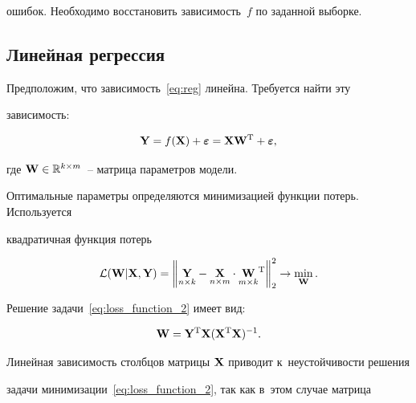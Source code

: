 ошибок. Необходимо восстановить зависимость~$f$ по заданной выборке.



\subsection{Линейная регрессия}



Предположим, что зависимость~\eqref{eq:reg} линейна. Требуется найти эту 

зависимость:

\begin{equation*}

    \bY = f(\bX) + \boldsymbol{\varepsilon}=\bX \bW^{\mathrm{T}} + 

\boldsymbol{\varepsilon},


\end{equation*}

 где $\mathbf{W} \in \mathbb{R}^{k \times m}$~-- матрица параметров модели.



Оптимальные параметры определяются минимизацией функции потерь. Используется 

квадратичная функция потерь

\begin{equation}

    \mathcal{L}({\bW} | {\bX}, {\bY}) = {\left\| \underset{n \times k}{\bY}  - 

\underset{n \times m}{\bX} \cdot \underset{m \times k}{\bW}^{\mathrm{T}} \right\| }_2^2 

\rightarrow\min_{\bW}.

    \label{eq:loss_function_2}

\end{equation}



Решение задачи~\eqref{eq:loss_function_2} имеет вид:

\begin{equation*}

    \bW = \bY^{\mathrm{T}} \bX (\bX^{\mathrm{T}} \bX)^{-1}.

\end{equation*}

Линейная зависимость столбцов матрицы $\mathbf{X}$ приводит к~неустойчивости решения 

задачи минимизации~\eqref{eq:loss_function_2}, так как в~этом случае матрица 

